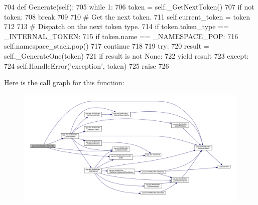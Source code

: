 \begin{DoxyCode}
704     \textcolor{keyword}{def }Generate(self):
705         \textcolor{keywordflow}{while} 1:
706             token = self.\_GetNextToken()
707             \textcolor{keywordflow}{if} \textcolor{keywordflow}{not} token:
708                 \textcolor{keywordflow}{break}
709 
710             \textcolor{comment}{# Get the next token.}
711             self.current\_token = token
712 
713             \textcolor{comment}{# Dispatch on the next token type.}
714             \textcolor{keywordflow}{if} token.token\_type == \_INTERNAL\_TOKEN:
715                 \textcolor{keywordflow}{if} token.name == \_NAMESPACE\_POP:
716                     self.namespace\_stack.pop()
717                 \textcolor{keywordflow}{continue}
718 
719             \textcolor{keywordflow}{try}:
720                 result = self.\_GenerateOne(token)
721                 \textcolor{keywordflow}{if} result \textcolor{keywordflow}{is} \textcolor{keywordflow}{not} \textcolor{keywordtype}{None}:
722                     \textcolor{keywordflow}{yield} result
723             \textcolor{keywordflow}{except}:
724                 self.HandleError(\textcolor{stringliteral}{'exception'}, token)
725                 \textcolor{keywordflow}{raise}
726 
\end{DoxyCode}
Here is the call graph for this function\+:
\nopagebreak
\begin{figure}[H]
\begin{center}
\leavevmode
\includegraphics[width=350pt]{classcpp_1_1ast_1_1AstBuilder_aebd0392eee56def849468af5b93b720a_cgraph}
\end{center}
\end{figure}
\mbox{\label{classcpp_1_1ast_1_1AstBuilder_af22fb880867876144d20818391ad267a}} 
